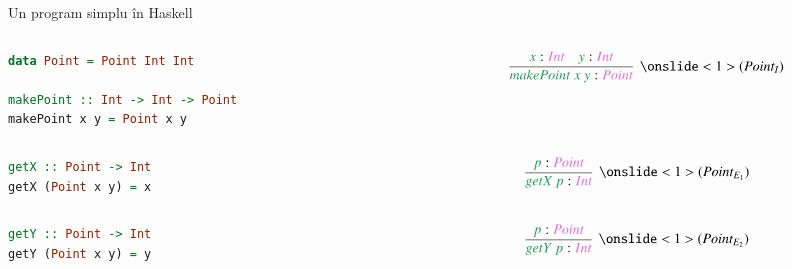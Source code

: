 \documentclass[xcolor=pdftex,romanian,colorlinks]{beamer}
\begin{document}
\begin{frame}[fragile]{Un program simplu în  Haskell}

\vspace{-.2cm}

\medskip
\begin{columns}
\begin{column}{0.55\textwidth}
\begin{lstlisting}[basicstyle=\small,language=Haskell]
data Point = Point Int Int

makePoint :: Int -> Int -> Point
makePoint x y = Point x y
\end{lstlisting}
\end{column}
\begin{column}{0.4\textwidth}
\[
\infer[\onslide<1>{(Point_I)}]
	{{\color{True}makePoint\ x\ y} : \sel{Point}}
	{{\color{True}x} : \sel{Int} \quad {\color{True}y} : \sel{Int}}
\]
\end{column}
\end{columns}



\begin{columns}
\begin{column}{0.55\textwidth}
\begin{lstlisting}[basicstyle=\small,language=Haskell]
getX :: Point -> Int
getX (Point x y) = x
\end{lstlisting}
\end{column}
\begin{column}{0.4\textwidth}
\[
\infer[\onslide<1>{(Point_{E_1})}]
	{{\color{True}getX\ p} : \sel{Int}}
	{{\color{True}p} : \sel{Point}}
\]
\end{column}
\end{columns}



\begin{columns}
\begin{column}{0.55\textwidth}
\begin{lstlisting}[basicstyle=\small,language=Haskell]
getY :: Point -> Int
getY (Point x y) = y
\end{lstlisting}
\end{column}
\begin{column}{0.4\textwidth}
\[
\infer[\onslide<1>{(Point_{E_2})}]
	{{\color{True}getY\ p} : \sel{Int}}
	{{\color{True}p} : \sel{Point}}
\]
\end{column}
\end{columns}
\end{frame}
\end{document}
